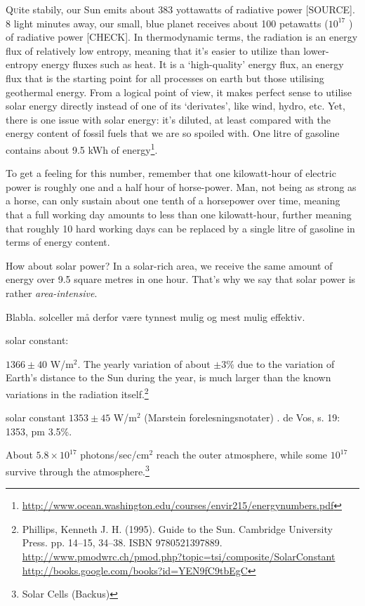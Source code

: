 \documentclass[11pt,bibliography=totoc,index=totoc]{scrbook}   %
\begin{document}
\lettrine[lines=3,slope=0pt,nindent=0pt,lraise=0.12]{Q}uite
stabily, our Sun emits about 383 yottawatts of radiative power [SOURCE]. 
8 light minutes away, our small, blue planet receives about 100 petawatts ($10^{17}$
) of radiative power [CHECK].
In thermodynamic terms, the radiation is an
energy flux of relatively low entropy, meaning that it's easier to utilize
than lower-entropy energy fluxes such as heat. It is a `high-quality' energy
flux, an energy flux that is the starting point for all processes on earth
but those utilising geothermal energy. From a logical point of view, it makes
perfect sense to utilise solar energy directly instead of one of its
`derivates', like wind, hydro, etc. Yet, there is one issue with solar
energy: it's diluted, at least compared with the energy content of fossil
fuels that we are so spoiled with. One litre of gasoline contains about 9.5 kWh of
energy\footnote{\url{http://www.ocean.washington.edu/courses/envir215/energynumbers.pdf}}.

To get a feeling for this number, remember that one kilowatt-hour of electric power 
is roughly one and a half hour of horse-power. Man, not being as strong as a
horse, can only sustain about one tenth of a horsepower over time, meaning that a 
full working day amounts to less than one kilowatt-hour, further meaning that 
roughly 10 hard working days can be replaced by a single litre of gasoline in terms
of energy content. 

How about solar power? In a solar-rich area, we receive the same amount of energy 
over 9.5 square metres in one hour. That's why we say that solar power is rather
\emph{area-intensive}.

Blabla. solceller må derfor være tynnest mulig og mest mulig effektiv.

solar constant: 

$1366\pm 40$ W/m$^2$. The yearly variation of about $\pm 3\%$ 
due to the variation of Earth's distance to the Sun during the year, is much
larger than the known variations in the radiation itself.\footnote{
Phillips, Kenneth J. H. (1995). Guide to the Sun. Cambridge University Press. 
pp. 14–15, 34–38. ISBN 9780521397889.
\url{http://www.pmodwrc.ch/pmod.php?topic=tsi/composite/SolarConstant}
\url{http://books.google.com/books?id=YEN9fC9tbEgC}
}

solar constant $1353\pm 45$ W/m$^2$ (Marstein forelesningsnotater)
. de Vos, s. 19: 1353, pm 3.5\%.

About $5.8\times 10^{17}$ photons/sec/cm$^2$ reach the outer atmosphere, while
some $10^{17}$ survive through the atmosphere.\footnote{Solar Cells (Backus)}
\end{document}
